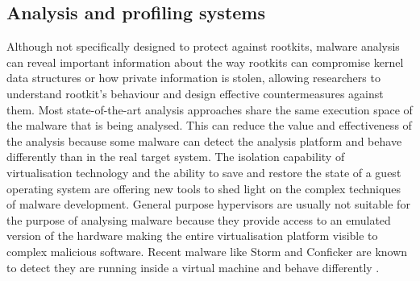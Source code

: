 \subsection{Analysis and profiling systems} \label{profiling}
Although not specifically designed to protect against rootkits, malware analysis can reveal important information about the way rootkits can compromise kernel data structures or how private information is stolen, allowing researchers to understand rootkit's behaviour and design effective countermeasures against them. 
Most state-of-the-art analysis approaches share the same execution space of the malware that is being analysed. This can reduce the value and effectiveness of the analysis because some malware can detect the analysis platform and behave differently than in the real target system. 
The isolation capability of virtualisation technology and the ability to save and restore the state of a guest operating system are offering new tools to shed light on the complex techniques of malware development. 
General purpose hypervisors are usually not suitable for the purpose of analysing malware because they provide access to an emulated version of the hardware making the entire virtualisation platform visible to complex malicious software. 
Recent malware like Storm and Conficker are known to detect they are running inside a virtual machine and behave differently \cite{conficker, ecards}.


